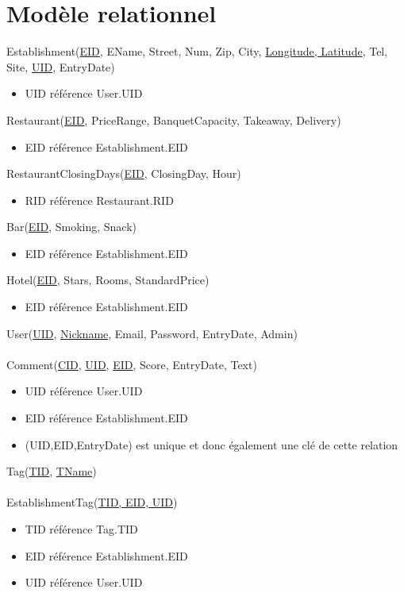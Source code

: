 \documentclass[11pt,a4paper]{report}
\begin{document}
\section*{Modèle relationnel}
\noindent
Establishment(\underline{EID}, EName, Street, Num, Zip, City, \underline{Longitude, Latitude}, Tel, Site, \underline{UID}, EntryDate)
\begin{itemize}
\item UID référence User.UID\\
\end{itemize}
Restaurant(\underline{EID}, PriceRange, BanquetCapacity, Takeaway, Delivery)
\begin{itemize}
\item EID référence Establishment.EID\\
\end{itemize} 
RestaurantClosingDays(\underline{EID}, ClosingDay, Hour)
\begin{itemize}
\item RID référence Restaurant.RID\\
\end{itemize}
Bar(\underline{EID}, Smoking, Snack)
\begin{itemize}
\item EID référence Establishment.EID\\
\end{itemize}
Hotel(\underline{EID}, Stars, Rooms, StandardPrice)
\begin{itemize}
\item EID référence Establishment.EID\\
\end{itemize}
User(\underline{UID}, \underline{Nickname}, Email, Password, EntryDate, Admin)\\ \\
%
Comment(\underline{CID}, \underline{UID}, \underline{EID}, Score, EntryDate, Text)
\begin{itemize}
\item UID référence User.UID
\item EID référence Establishment.EID
\item (UID,EID,EntryDate) est unique et donc également une clé de cette relation\\
\end{itemize}
Tag(\underline{TID}, \underline{TName})\\ \\
EstablishmentTag(\underline{TID, EID, UID})
\begin{itemize}
\item TID référence Tag.TID
\item EID référence Establishment.EID
\item UID référence User.UID\\
\end{itemize}
\end{document}
